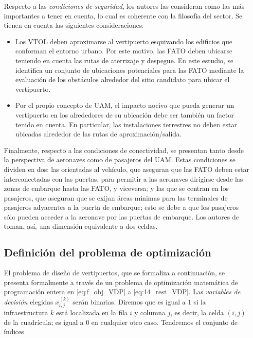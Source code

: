 \documentclass[12pt,a4paper]{book}
\begin{document}
Respecto a las \textsl{condiciones de seguridad}, los autores las consideran como las más importantes a tener en cuenta, lo cual es coherente con la filosofía del sector. Se tienen en cuenta las siguientes consideraciones: 
	 \begin{itemize}
		\item Los VTOL deben aproximarse al vertipuerto esquivando los edificios que conforman el entorno urbano. Por este motivo, las FATO deben ubicarse teniendo en cuenta las rutas de aterrizaje y despegue. En este estudio, se identifica un conjunto de ubicaciones potenciales para las FATO mediante la evaluación de los obstáculos alrededor del sitio candidato para ubicar el vertipuerto.
		\item Por el propio concepto de UAM, el impacto nocivo que pueda generar un vertipuerto en los alrededores de su ubicación debe ser también un factor tenido en cuenta. En particular, las instalaciones terrestres no deben estar ubicadas alrededor de las rutas de aproximación/salida.
	\end{itemize}

Finalmente, respecto a las condiciones de conectividad, se presentan tanto desde la perspectiva de aeronaves como de pasajeros del UAM. Estas condiciones se dividen en dos: las orientadas al vehículo, que aseguran que las FATO deben estar interconectadas con las puertas, para permitir a las aeronaves dirigirse desde las zonas de embarque hasta las FATO, y viceversa; y las que se centran en los pasajeros, que aseguran que se exijan áreas mínimas para las terminales de pasajeros adyacentes a la puerta de embarque; esto se debe a que los pasajeros sólo pueden acceder a la aeronave por las puertas de embarque. Los autores de \cite{park_vertiport_2022} toman, así, una dimensión equivalente a dos celdas. 


\subsection{Definición del problema de optimización}
El problema de diseño de vertipuertos, que se formaliza a continuación, se presenta formalmente a través de un problema de optimización matemática de programación entera en \ref{eq:f_obj_VDP} a \ref{eq:14_rest_VDP}. Las \textsl{variables de decisión} elegidas $x_{i,j}^{(k)}$ serán binarias. Diremos que es igual a $1$ si la infraestructura $k$ está localizada en la fila $i$ y columna $j$, es decir, la celda $(i,j)$ de la cuadrícula; es igual a $0$ en cualquier otro caso. Tendremos el conjunto de índices 
\end{document}
